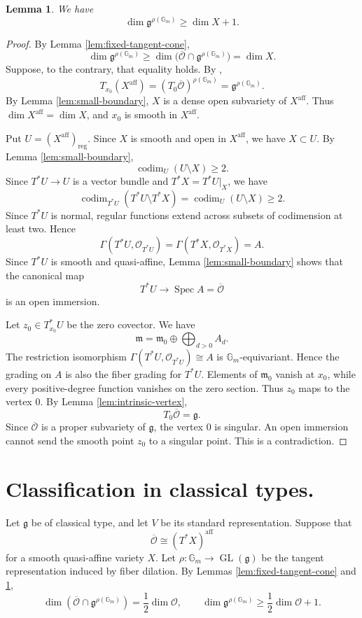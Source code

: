 \documentclass[10pt,a4paper]{amsart}
\newtheorem{lemma}[theorem]{Lemma}
\DeclareMathOperator{\Spec}{Spec}
\newcommand{\Gm}{\mathbb G_m}
\newcommand{\aff}{\mathrm{aff}}
\begin{document}
\begin{lemma}\label{lem:strict-bound}
We have
\[
\dim\mathfrak g^{\rho(\Gm)}\geq\dim X+1.
\]
\end{lemma}

\begin{proof}
By Lemma \ref{lem:fixed-tangent-cone},
\[
\dim\mathfrak g^{\rho(\Gm)}
\geq
\dim\bigl(\overline{\mathcal O}\cap\mathfrak g^{\rho(\Gm)}\bigr)
=\dim X.
\]
Suppose, to the contrary, that equality holds. By
\cite[Lemma 5.4]{Jia},
\[
T_{x_0}(X^{\aff})
=(T_0\overline{\mathcal O})^{\rho(\Gm)}
=\mathfrak g^{\rho(\Gm)}.
\]
By Lemma \ref{lem:small-boundary}, $X$ is a dense open subvariety of
$X^{\aff}$. Thus $\dim X^{\aff}=\dim X$, and $x_0$ is smooth in
$X^{\aff}$.

Put $U=(X^{\aff})_{\mathrm{reg}}$. Since $X$ is smooth and open in
$X^{\aff}$, we have $X\subset U$. By Lemma \ref{lem:small-boundary},
\[
\operatorname{codim}_U(U\setminus X)\geq2.
\]
Since $T^*U\to U$ is a vector bundle and $T^*X=T^*U|_X$, we have
\[
\operatorname{codim}_{T^*U}(T^*U\setminus T^*X)
=\operatorname{codim}_U(U\setminus X)\geq2.
\]
Since $T^*U$ is normal, regular functions extend across subsets of
codimension at least two. Hence
\[
\Gamma(T^*U,\mathcal O_{T^*U})
=
\Gamma(T^*X,\mathcal O_{T^*X})=A.
\]
Since $T^*U$ is smooth and quasi-affine, Lemma
\ref{lem:small-boundary} shows that the canonical map
\[
T^*U\longrightarrow\Spec A=\overline{\mathcal O}
\]
is an open immersion.

Let $z_0\in T^*_{x_0}U$ be the zero covector. We have
\[
\mathfrak m=\mathfrak m_0\oplus\bigoplus_{d>0}A_d.
\]
The restriction isomorphism
$\Gamma(T^*U,\mathcal O_{T^*U})\cong A$ is $\Gm$-equivariant. Hence
the grading on $A$ is also the fiber grading for $T^*U$.
Elements of $\mathfrak m_0$ vanish at $x_0$, while every
positive-degree function vanishes on the zero section. Thus $z_0$
maps to the vertex $0$. By Lemma \ref{lem:intrinsic-vertex},
\[
T_0\overline{\mathcal O}=\mathfrak g.
\]
Since $\overline{\mathcal O}$ is a proper subvariety of $\mathfrak g$,
the vertex $0$ is singular. An open immersion cannot send the smooth
point $z_0$ to a singular point. This is a contradiction.
\end{proof}

\section{Classification in classical types.}\label{sec:classical}

Let $\mathfrak g$ be of classical type, and let $V$ be its standard
representation. Suppose that
\[
\overline{\mathcal O}\cong(T^*X)^{\aff}
\]
for a smooth quasi-affine variety $X$. Let
$\rho:\Gm\to\operatorname{GL}(\mathfrak g)$ be the tangent
representation induced by fiber dilation.
By Lemmas \ref{lem:fixed-tangent-cone} and \ref{lem:strict-bound},
\begin{equation}\label{eq:fixed-dimensions}
\dim(\overline{\mathcal O}\cap \mathfrak g^{\rho(\Gm)})
=\frac12\dim\mathcal O,
\qquad
\dim \mathfrak g^{\rho(\Gm)}\geq\frac12\dim\mathcal O+1.
\end{equation}
\end{document}
